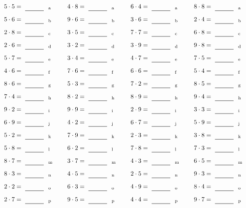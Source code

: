 \documentclass
[
  draft    = true,
  fontsize = 11pt,
  parskip  = half-
]
{scrartcl}
\begin{document}
\par\vfill\par
\begin{align*}
    \pline{5\cdot5}&=\rline{a}
  & \pline{4\cdot8}&=\rline{a}
  & \pline{6\cdot4}&=\rline{a}
  & \pline{8\cdot8}&=\rline{a} \\[1ex]
    \pline{5\cdot6}&=\rline{b}
  & \pline{9\cdot6}&=\rline{b}
  & \pline{3\cdot6}&=\rline{b}
  & \pline{2\cdot4}&=\rline{b} \\[1ex]
    \pline{2\cdot8}&=\rline{c}
  & \pline{3\cdot5}&=\rline{c}
  & \pline{7\cdot7}&=\rline{c}
  & \pline{6\cdot8}&=\rline{c} \\[1ex]
    \pline{2\cdot6}&=\rline{d}
  & \pline{3\cdot2}&=\rline{d}
  & \pline{3\cdot9}&=\rline{d}
  & \pline{9\cdot8}&=\rline{d} \\[1ex]
    \pline{5\cdot7}&=\rline{e}
  & \pline{3\cdot4}&=\rline{e}
  & \pline{4\cdot7}&=\rline{e}
  & \pline{7\cdot5}&=\rline{e} \\[1ex]
    \pline{4\cdot6}&=\rline{f}
  & \pline{7\cdot6}&=\rline{f}
  & \pline{6\cdot6}&=\rline{f}
  & \pline{5\cdot4}&=\rline{f} \\[1ex]
    \pline{8\cdot6}&=\rline{g}
  & \pline{5\cdot3}&=\rline{g}
  & \pline{7\cdot2}&=\rline{g}
  & \pline{8\cdot5}&=\rline{g} \\[1ex]
    \pline{7\cdot4}&=\rline{h}
  & \pline{8\cdot2}&=\rline{h}
  & \pline{8\cdot9}&=\rline{h}
  & \pline{9\cdot4}&=\rline{h} \\[1ex]
    \pline{9\cdot2}&=\rline{i}
  & \pline{9\cdot9}&=\rline{i}
  & \pline{2\cdot9}&=\rline{i}
  & \pline{3\cdot3}&=\rline{i} \\[1ex]
    \pline{6\cdot9}&=\rline{j}
  & \pline{4\cdot2}&=\rline{j}
  & \pline{6\cdot7}&=\rline{j}
  & \pline{5\cdot9}&=\rline{j} \\[1ex]
    \pline{5\cdot2}&=\rline{k}
  & \pline{7\cdot9}&=\rline{k}
  & \pline{2\cdot3}&=\rline{k}
  & \pline{3\cdot8}&=\rline{k} \\[1ex]
    \pline{5\cdot8}&=\rline{l}
  & \pline{6\cdot2}&=\rline{l}
  & \pline{7\cdot8}&=\rline{l}
  & \pline{7\cdot3}&=\rline{l} \\[1ex]
    \pline{8\cdot7}&=\rline{m}
  & \pline{3\cdot7}&=\rline{m}
  & \pline{4\cdot3}&=\rline{m}
  & \pline{6\cdot5}&=\rline{m} \\[1ex]
    \pline{8\cdot3}&=\rline{n}
  & \pline{4\cdot5}&=\rline{n}
  & \pline{2\cdot5}&=\rline{n}
  & \pline{9\cdot3}&=\rline{n} \\[1ex]
    \pline{2\cdot2}&=\rline{o}
  & \pline{6\cdot3}&=\rline{o}
  & \pline{4\cdot9}&=\rline{o}
  & \pline{8\cdot4}&=\rline{o} \\[1ex]
    \pline{2\cdot7}&=\rline{p}
  & \pline{9\cdot5}&=\rline{p}
  & \pline{4\cdot4}&=\rline{p}
  & \pline{9\cdot7}&=\rline{p}
\end{align*}
\end{document}
